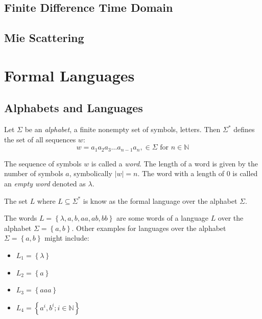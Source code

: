 \subsection*{Finite Difference Time Domain}
\subsection*{Mie Scattering}
\section{Formal Languages}

\subsection{Alphabets and Languages}

\begin{definition}[Alphabet]
\label{def:alphabet}
Let $\Sigma$ be an \emph{alphabet}, a finite nonempty set of symbols, letters. Then $\Sigma ^{*}$ defines the set of all sequences $w$:
$$w= a_1 a_2 a_3 \dots a_{n-1} a_n, \in \Sigma \text{ for } n \in \mathbb{N}$$
\end{definition}

The sequence of symbols $w$ is called a \emph{word}. The length of a word is given by the number of symbols $a$, symbolically $|w| = n$. The word with a length of 0 is called an \emph{empty word} denoted as $\lambda$.

\begin{definition}[Language]
\label{def:language}
The set $L$ where $L\subseteq \Sigma^{*}$ is know as the formal language over the alphabet $\Sigma$. 
\end{definition}
The words $L = \left\lbrace \lambda, a, b, aa, ab, bb \right\rbrace$ are some words of a language $L$ over the alphabet $\Sigma=\left\lbrace a,b \right\rbrace$.
Other examples for languages over the alphabet $\Sigma=\left\lbrace a,b \right\rbrace$ might include:
\begin{itemize}
\item $L_1 = \left\lbrace \lambda \right\rbrace$
\item $L_2 = \left\lbrace a \right\rbrace$
\item $L_3 = \left\lbrace aaa \right\rbrace$
\item $L_4 = \left\lbrace a^i,b^i; i \in \mathbb{N} \right\rbrace$
\end{itemize}




